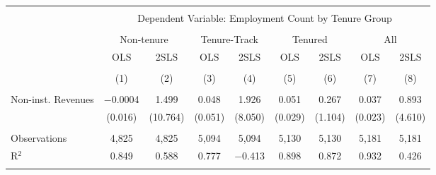 
\begin{tabular}{@{\extracolsep{5pt}}lcccccccc} 
\\[-1.8ex]\hline 
\hline \\[-1.8ex] 
 & \multicolumn{8}{c}{Dependent Variable: Employment Count by Tenure Group} \\ 
\cline{2-9} 
\\[-1.8ex] & \multicolumn{2}{c}{Non-tenure} & \multicolumn{2}{c}{Tenure-Track} & \multicolumn{2}{c}{Tenured} & \multicolumn{2}{c}{All} \\ 
 & OLS & 2SLS & OLS & 2SLS & OLS & 2SLS & OLS & 2SLS \\ 
\\[-1.8ex] & (1) & (2) & (3) & (4) & (5) & (6) & (7) & (8)\\ 
\hline \\[-1.8ex] 
 Non-inst. Revenues & $-$0.0004 & 1.499 & 0.048 & 1.926 & 0.051 & 0.267 & 0.037 & 0.893 \\ 
  & (0.016) & (10.764) & (0.051) & (8.050) & (0.029) & (1.104) & (0.023) & (4.610) \\ 
 \hline \\[-1.8ex] 
Observations & 4,825 & 4,825 & 5,094 & 5,094 & 5,130 & 5,130 & 5,181 & 5,181 \\ 
R$^{2}$ & 0.849 & 0.588 & 0.777 & $-$0.413 & 0.898 & 0.872 & 0.932 & 0.426 \\ 
\hline 
\hline \\[-1.8ex] 
\end{tabular} 
